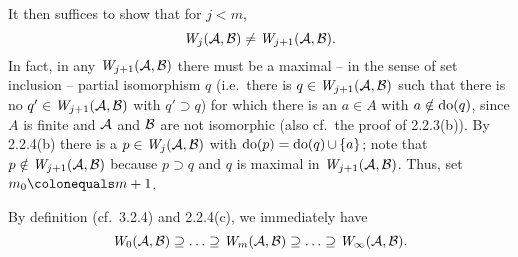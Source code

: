 \begin{enumerate}[1.]
\[\]
It then suffices to show that for $j < m$, 
\[
\winpos{j}(\strct{A}, \strct{B}) \neq \winpos{j + 1}(\strct{A}, \strct{B}).
\]
In fact, in any $\winpos{j + 1}(\strct{A}, \strct{B})$ there must be a maximal -- in the sense of set inclusion -- partial isomorphism $q$ (i.e.\ there is $q \in \winpos{j + 1}(\strct{A}, \strct{B})$ such that there is no $q' \in \winpos{j + 1}(\strct{A}, \strct{B})$ with $q' \supset q$) for which there is an $a \in A$ with $a \notin \mathrm{do}(q)$, since $A$ is finite and $\mathcal{A}$ and $\mathcal{B}$ are not isomorphic (also cf.\ the proof of 2.2.3(b)). By 2.2.4(b) there is a $p \in \winpos{j}(\strct{A}, \strct{B})$ with $\mathrm{do}(p) = \mathrm{do}(q) \mathop{\cup} {\{a\}}$; note that $p \notin \winpos{j + 1}(\strct{A}, \strct{B})$ because $p \supset q$ and $q$ is maximal in $\winpos{j + 1}(\strct{A}, \strct{B})$. Thus, set $m_0 \defas m + 1$.
\begin{remark}
By definition (cf.\ 3.2.4) and 2.2.4(c), we immediately have
\[
\winpos{0}(\strct{A}, \strct{B}) \supseteq \etc \supseteq \winpos{m}(\strct{A}, \strct{B}) \supseteq \etc \supseteq \winpos{\infty}(\strct{A}, \strct{B}).
\]
\end{remark}
%
\end{enumerate}


